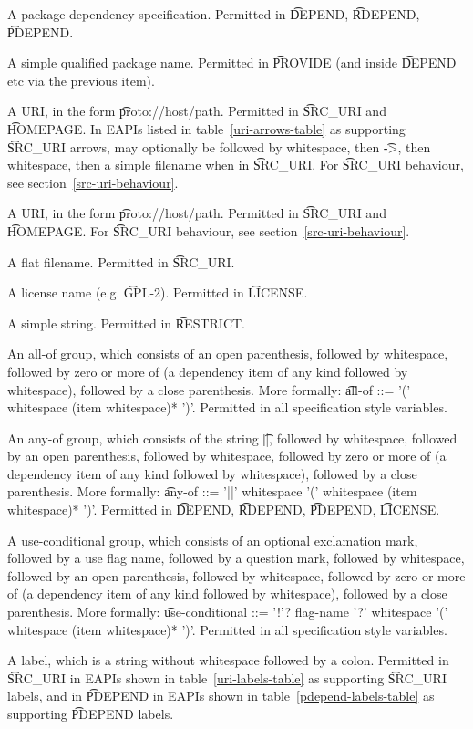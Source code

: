 \begin{compactitem}
\item A package dependency specification. Permitted in \t{DEPEND}, \t{RDEPEND}, \t{PDEPEND}.
\item A simple qualified package name. Permitted in \t{PROVIDE} (and inside \t{DEPEND} etc
    via the previous item).
\IFKDEBUILDELSE
{
    \item A URI, in the form \t{proto://host/path}. Permitted in \t{SRC\_URI} and \t{HOMEPAGE}.
    In EAPIs listed in table~\ref{uri-arrows-table} as supporting \t{SRC\_URI} arrows, may
    optionally be followed by whitespace, then \t{->}, then whitespace, then a simple filename
    when in \t{SRC\_URI}. For \t{SRC\_URI} behaviour, see section~\ref{src-uri-behaviour}.
}{
    \item A URI, in the form \t{proto://host/path}. Permitted in \t{SRC\_URI} and \t{HOMEPAGE}.
    For \t{SRC\_URI} behaviour, see section~\ref{src-uri-behaviour}.
}
\item A flat filename. Permitted in \t{SRC\_URI}.
\item A license name (e.g. \t{GPL-2}). Permitted in \t{LICENSE}.
\item A simple string. Permitted in \t{RESTRICT}.
\item An all-of group, which consists of an open parenthesis, followed by whitespace,
    followed by zero or more of (a dependency item of any kind followed by whitespace), followed
    by a close parenthesis. More formally:
    \t{all-of ::= '(' whitespace (item whitespace)* ')'}. Permitted in all specification style
    variables.
\item An any-of group, which consists of the string \t{||}, followed by whitespace,
    followed by an open parenthesis, followed by whitespace, followed by zero or more
    of (a dependency item of any kind followed by whitespace), followed by a close parenthesis.
    More formally: \t{any-of ::= '||' whitespace '(' whitespace (item whitespace)* ')'}.
    Permitted in \t{DEPEND}, \t{RDEPEND}, \t{PDEPEND}, \t{LICENSE}.
\item A use-conditional group, which consists of an optional exclamation mark, followed by
    a use flag name, followed by a question mark, followed by whitespace, followed by
    an open parenthesis, followed by whitespace, followed by zero or more of (a dependency item
    of any kind followed by whitespace), followed by a close parenthesis. More formally:
    \t{use-conditional ::= '!'? flag-name '?' whitespace '(' whitespace (item whitespace)* ')'}.
    Permitted in all specification style variables.
\IFKDEBUILDELSE
{
    \item A label, which is a string without whitespace followed by a colon. Permitted in
    \t{SRC\_URI} in EAPIs shown in table~\ref{uri-labels-table} as supporting \t{SRC\_URI} labels,
    and in \t{PDEPEND} in EAPIs shown in table~\ref{pdepend-labels-table} as supporting \t{PDEPEND}
    labels.
}{
}
\end{compactitem}

